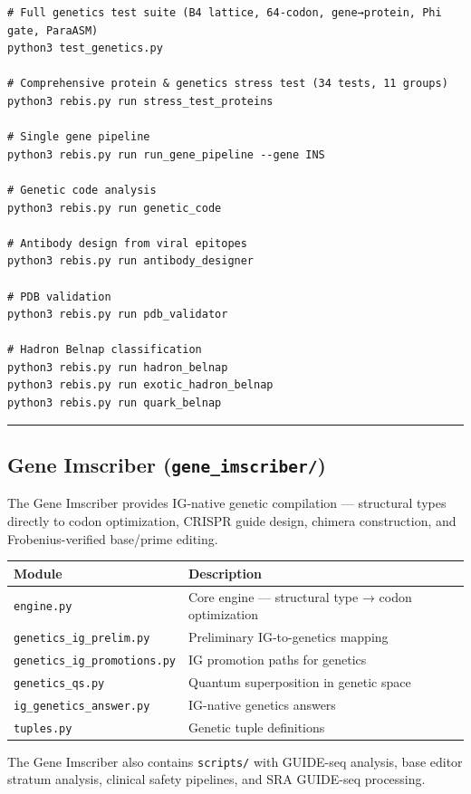 \begin{verbatim}
# Full genetics test suite (B4 lattice, 64-codon, gene→protein, Phi gate, ParaASM)
python3 test_genetics.py

# Comprehensive protein & genetics stress test (34 tests, 11 groups)
python3 rebis.py run stress_test_proteins

# Single gene pipeline
python3 rebis.py run run_gene_pipeline --gene INS

# Genetic code analysis
python3 rebis.py run genetic_code

# Antibody design from viral epitopes
python3 rebis.py run antibody_designer

# PDB validation
python3 rebis.py run pdb_validator

# Hadron Belnap classification
python3 rebis.py run hadron_belnap
python3 rebis.py run exotic_hadron_belnap
python3 rebis.py run quark_belnap
\end{verbatim}

\begin{center}\rule{0.5\linewidth}{0.5pt}\end{center}

\hypertarget{gene-imscriber-gene_imscriber}{%
\subsection{\texorpdfstring{Gene Imscriber
(\texttt{gene\_imscriber/})}{Gene Imscriber (gene\_imscriber/)}}\label{gene-imscriber-gene_imscriber}}

The Gene Imscriber provides IG-native genetic compilation --- structural
types directly to codon optimization, CRISPR guide design, chimera
construction, and Frobenius-verified base/prime editing.

\begin{longtable}[]{@{}ll@{}}
\toprule
Module & Description\tabularnewline
\midrule
\endhead
\texttt{engine.py} & Core engine --- structural type → codon
optimization\tabularnewline
\texttt{genetics\_ig\_prelim.py} & Preliminary IG-to-genetics
mapping\tabularnewline
\texttt{genetics\_ig\_promotions.py} & IG promotion paths for
genetics\tabularnewline
\texttt{genetics\_qs.py} & Quantum superposition in genetic
space\tabularnewline
\texttt{ig\_genetics\_answer.py} & IG-native genetics
answers\tabularnewline
\texttt{tuples.py} & Genetic tuple definitions\tabularnewline
\bottomrule
\end{longtable}

The Gene Imscriber also contains \texttt{scripts/} with GUIDE-seq
analysis, base editor stratum analysis, clinical safety pipelines, and
SRA GUIDE-seq processing.


